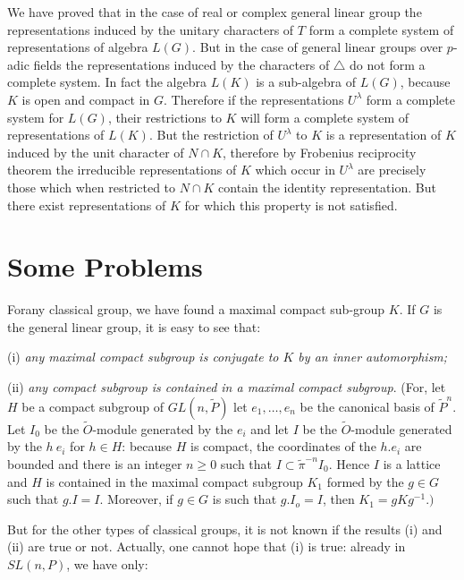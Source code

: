 \begin{remark*}%
  We have proved that in the case of real or complex general linear
  group the representations induced by the unitary characters of $T$
  form a complete system of representations of algebra $L(G)$. But in
  the case of general linear groups over $p$-adic fields the
  representations induced by the characters of $\triangle$ do not form
  a complete system. In fact the algebra $L(K)$ is a sub-algebra of
  $L(G)$, because $K$ is open and compact in $G$. Therefore if the
  representations $U^\lambda$ form a complete system for $L(G)$, their
  restrictions to $K$ will form a complete system of representations
  of $L(K)$. But the restriction of $U^\lambda$ to $K$ is a
  representation of $K$ induced by the unit character of $N\cap K$,
  therefore by Frobenius reciprocity theorem the irreducible
  representations of $K$ which occur in $U^\lambda$ are precisely
  those which when restricted to $N\cap K$ contain the identity
  representation. But there exist representations of $K$ for which
  this property is not satisfied. 
\end{remark*} 

\section{Some Problems}\label{part2:chap2:sec5}


For\pageoriginale any classical group, we have found a maximal
compact sub-group 
$K$. If $G$ is the general linear group, it is easy to see that: 

(i) \textit{any maximal compact subgroup is conjugate to $K$ by an
  inner automorphism;} 

(ii) \textit{any compact subgroup is contained in a maximal compact
  subgroup}. (For, let $H$ be a compact subgroup of $GL(n,\tilde{P})$
  let $e_1,\ldots,e_n$ be the canonical basis of $\tilde{P}^n$. Let
  $I_0$ be the $\tilde{O}$-module generated by the $e_i$ and let $I$
  be the $\tilde{O}$-module generated by the $h~e_i$ for $h \in H$:
  because $H$ is compact, the coordinates of the $h.e_i$ are bounded
  and there is an integer $n\geq 0$ such that $I \subset
  \tilde{\pi}^{-n}I_0$. Hence $I$ is a lattice and $H$ is contained in
  the maximal compact subgroup $K_1$ formed by the $g \in G$ such that
  $g.I = I$. Moreover, if $g \in G$ is such that $g.I_o =I$, then $K_1
  = gKg^{-1}.)$ 

  But for the other types of classical groups, it is not known if the
  results (i) and (ii) are true or not. Actually, one cannot hope that
  (i) is true: already in $SL(n,P)$, we have only: 

